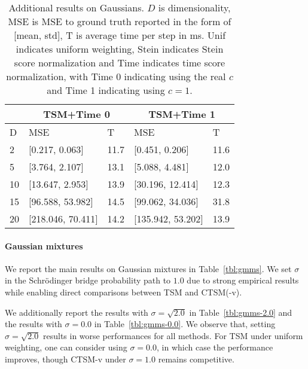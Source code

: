 \begin{table*}
        \begin{center}
        \caption{Additional results on Gaussians. $D$ is dimensionality, MSE is MSE to ground truth reported in the form of [mean, std], T is average time per step in ms. Unif indicates uniform weighting, Stein indicates Stein score normalization and Time indicates time score normalization, with Time 0 indicating using the real $c$ and Time 1 indicating using $c=1$.}
                \begin{tabular}{|l|l|l|l|l|}
                        \hline
                        & \multicolumn{2}{|c|}{TSM+Time 0} & \multicolumn{2}{|c|}{TSM+Time 1} \\
                        \hline
                        D & MSE & T & MSE & T \\
                        \hline
                        2 & [0.217, 0.063] & 11.7 & [0.451, 0.206] & 11.6 \\
                        \hline
                        5 & [3.764, 2.107] & 13.1 & [5.088, 4.481] & 12.0 \\
                        \hline
                        10 & [13.647, 2.953] & 13.9 & [30.196, 12.414] & 12.3 \\
                        \hline
                        15 & [96.588, 53.982] & 14.5 & [99.062, 34.036] & 31.8 \\
                        \hline
                        20 & [218.046, 70.411] & 14.2 & [135.942, 53.202] & 13.9 \\
                        \hline
                \end{tabular}
        \label{tbl:gaussians-extras}
        \end{center}
\end{table*}

\paragraph{Gaussian mixtures}

We report the main results on Gaussian mixtures in Table~\ref{tbl:gmms}. We set $\sigma$ in the Schrödinger bridge probability path to $1.0$ due to strong empirical results while enabling direct comparisons between TSM and CTSM(-v).

We additionally report the results with $\sigma=\sqrt{2.0}$ in Table~\ref{tbl:gmms-2.0} and the results with $\sigma=0.0$ in Table~\ref{tbl:gmms-0.0}. We observe that, setting $\sigma=\sqrt{2.0}$ results in worse performances for all methods. For TSM under uniform weighting, one can consider using $\sigma=0.0$, in which case the performance improves, though CTSM-v under $\sigma=1.0$ remains competitive.

